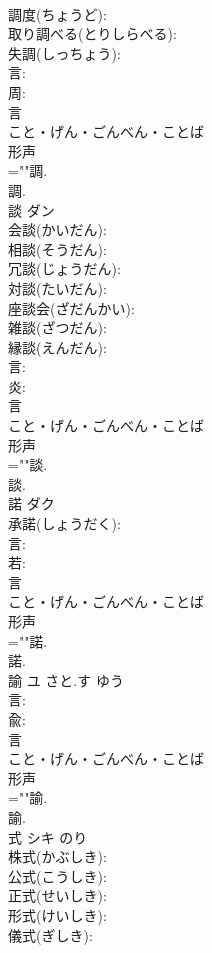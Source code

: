 \documentclass[8pt]{extreport}
\begin{document}
\begin{CJK}{UTF8}{min}
\\	調度(ちょうど): 
\\	取り調べる(とりしらべる): 
\\	失調(しっちょう): 
\\	言: 
\\	周: 
\\	言	
\\	こと・げん・ごんべん・ことば	
\\	形声 
\\	=""調.
\\	調.
\\	談	ダン			
\\	会談(かいだん): 
\\	相談(そうだん): 
\\	冗談(じょうだん): 
\\	対談(たいだん): 
\\	座談会(ざだんかい): 
\\	雑談(ざつだん): 
\\	縁談(えんだん): 
\\	言: 
\\	炎: 
\\	言	
\\	こと・げん・ごんべん・ことば	
\\	形声 
\\	=""談.
\\	談.
\\	諾	ダク			
\\	承諾(しょうだく): 
\\	言: 
\\	若: 
\\	言	
\\	こと・げん・ごんべん・ことば	
\\	形声 
\\	=""諾.
\\	諾.
\\	諭	ユ	さと.す	ゆう	
\\	言: 
\\	兪: 
\\	言	
\\	こと・げん・ごんべん・ことば	
\\	形声 
\\	=""諭.
\\	諭.
\\	式	シキ		のり	
\\	株式(かぶしき): 
\\	公式(こうしき): 
\\	正式(せいしき): 
\\	形式(けいしき): 
\\	儀式(ぎしき): 

\end{CJK}
\end{document}
